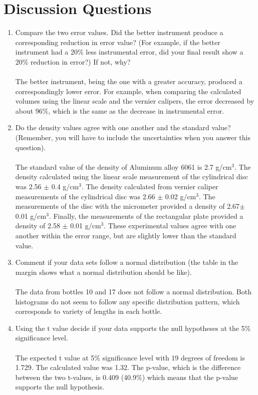 \documentclass[12pt]{article}
\begin{document}
\section{Discussion Questions}
\begin{enumerate}
    \item Compare the two error values. Did the better instrument produce a corresponding reduction in error value? (For example, if the better instrument had a 20\% less instrumental error, did your final result show a 20\% reduction in error?) If not, why?\\\\
    The better instrument, being the one with a greater accuracy, produced a correspondingly lower error. For example, when comparing the calculated volumes using the linear scale and the vernier calipers, the error decreased by about 96\%, which is the same as the decrease in instrumental error.\\
    \item Do the density values agree with one another and the standard value? (Remember, you will have to include the uncertainties when you answer this question).\\\\
    The standard value of the density of Aluminum alloy 6061 is 2.7 g/cm$^3$. The density calculated using the linear scale measurement of the cylindrical disc was 2.56 $\pm$ 0.4 g/cm$^3$. The density calculated from vernier caliper measurements of the cylindrical disc was 2.66 $\pm$ 0.02 g/cm$^3$. The measurements of the disc with the micrometer provided a density of 2.67$\pm$ 0.01 g/cm$^3$. Finally, the measurements of the rectangular plate provided a density of 2.58 $\pm$ 0.01 g/cm$^3$. These experimental values agree with one another within the error range, but are slightly lower than the standard value.\\
    \item Comment if your data sets follow a normal distribution (the table in the margin shows what a normal distribution should be like).\\\\
    The data from bottles 10 and 17 does not follow a normal distribution. Both histograms do not seem to follow any specific distribution pattern, which corresponds to variety of lengths in each bottle.\\
    \item Using the t value decide if your data supports the null hypotheses at the 5\% significance level.\\\\
    The expected t value at 5\% significance level with 19 degrees of freedom is 1.729. The calculated value was 1.32. The p-value, which is the difference between the two t-values, is 0.409 (40.9\%) which means that the p-value supports the null hypothesis.
\end{enumerate}
\end{document}
